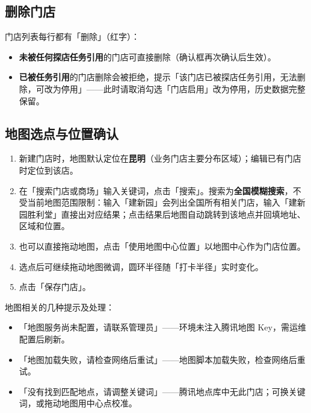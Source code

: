 \documentclass[12pt,a4paper,fontset=none]{ctexart}
\begin{document}
\subsection{删除门店}
门店列表每行都有「删除」（红字）：

\begin{itemize}
\item \textbf{未被任何探店任务引用}的门店可直接删除（确认框再次确认后生效）。
\item \textbf{已被任务引用}的门店删除会被拒绝，提示「该门店已被探店任务引用，无法删除，可改为停用」——此时请取消勾选「门店启用」改为停用，历史数据完整保留。
\end{itemize}

\subsection{地图选点与位置确认}
\begin{enumerate}
\item 新建门店时，地图默认定位在\textbf{昆明}（业务门店主要分布区域）；编辑已有门店时定位到该店。
\item 在「搜索门店或商场」输入关键词，点击「搜索」。搜索为\textbf{全国模糊搜索}，不受当前地图范围限制：输入「建新园」会列出全国所有相关门店，输入「建新园胜利堂」直接出对应结果；点击结果后地图自动跳转到该地点并回填地址、区域和位置。
\item 也可以直接拖动地图，点击「使用地图中心位置」以地图中心作为门店位置。
\item 选点后可继续拖动地图微调，圆环半径随「打卡半径」实时变化。
\item 点击「保存门店」。

\end{enumerate}

地图相关的几种提示及处理：

\begin{itemize}
\item 「地图服务尚未配置，请联系管理员」——环境未注入腾讯地图 Key，需运维配置后刷新。
\item 「地图加载失败，请检查网络后重试」——地图脚本加载失败，检查网络后重试。
\item 「没有找到匹配地点，请调整关键词」——腾讯地点库中无此门店；可换关键词，或拖动地图用中心点校准。
\end{itemize}

\end{document}
